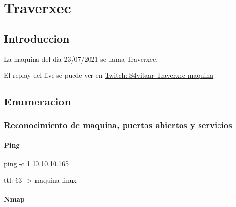 \documentclass{assets/ipesethesis}
\newenvironment{Shaded}{\begin{snugshade}}{\end{snugshade}}
\newcommand{\FunctionTok}[1]{\textcolor[rgb]{0.00,0.00,0.00}{#1}}
\newcommand{\NormalTok}[1]{#1}
\begin{document}
\hypertarget{traverxec}{%
\chapter*{Traverxec}\label{traverxec}}

\hypertarget{introduccion-1}{%
\section*{Introduccion}\label{introduccion-1}}

La maquina del dia 23/07/2021 se llama Traverxec.

El replay del live se puede ver en \href{https://www.twitch.tv/videos/1095841567}{Twitch: S4vitaar Traverxec maquina}

\hypertarget{enumeracion-1}{%
\section*{Enumeracion}\label{enumeracion-1}}

\hypertarget{reconocimiento-de-maquina-puertos-abiertos-y-servicios-1}{%
\subsection*{Reconocimiento de maquina, puertos abiertos y servicios}\label{reconocimiento-de-maquina-puertos-abiertos-y-servicios-1}}

\hypertarget{ping-1}{%
\subsubsection*{Ping}\label{ping-1}}

\begin{Shaded}
\begin{Highlighting}[]
\FunctionTok{ping}\NormalTok{ -c 1 10.10.10.165}
\end{Highlighting}
\end{Shaded}

ttl: 63 -\textgreater{} maquina linux

\hypertarget{nmap-1}{%
\subsubsection*{Nmap}\label{nmap-1}}
\end{document}
